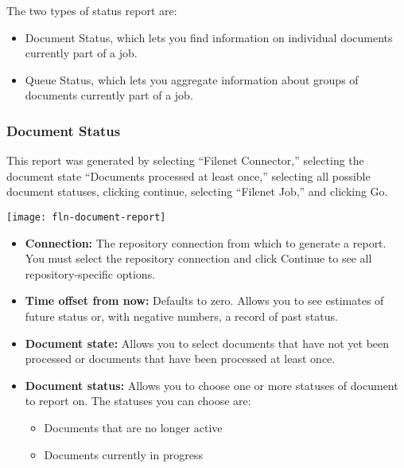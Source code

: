 \begin{changemargin}{1.5in}{0in}
The two types of status report are:

\begin{itemize}

\item Document Status, which lets you find information on individual
documents currently part of a job.

\item Queue Status, which lets you aggregate information about groups
of documents currently part of a job.

\end{itemize}

\subsubsection{Document Status}

This report was generated by selecting ``Filenet Connector,''
selecting the document state ``Documents processed at least once,''
selecting all possible document statuses, clicking continue, selecting
``Filenet Job,'' and clicking Go.

\texttt{[image: fln-document-report]}

\begin{itemize}

\item \textbf{Connection:} The repository connection from which to 
generate a report. You must select the repository connection and click
Continue to see all repository-specific options.

\item \textbf{Time offset from now:} Defaults to zero. Allows you to
see estimates of future status or, with negative numbers, a record of
past status.

\item \textbf{Document state:} Allows you to select documents that
have not yet been processed or documents that have been processed
at least once.

\item \textbf{Document status:} Allows you to choose one or more 
statuses of document to report on. The statuses you can choose are:

\begin{itemize}

\item Documents that are no longer active

\item Documents currently in progress


\end{itemize}
\end{itemize}
\end{changemargin}
